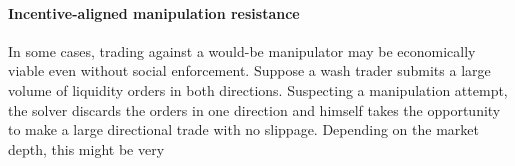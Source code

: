 \documentclass[a4paper,10pt]{article}
\theoremstyle{remark}
\begin{document}
\paragraph{Incentive-aligned manipulation resistance}
In some cases, trading against a would-be manipulator may be economically viable even without social enforcement.
%
Suppose a wash trader submits a large volume of liquidity orders in both directions.
%
Suspecting a manipulation attempt, the solver discards the orders in one direction and himself takes the opportunity to make a large directional trade with no slippage.
%
Depending on the market depth, this might be very

\printbibliography
\end{document}

